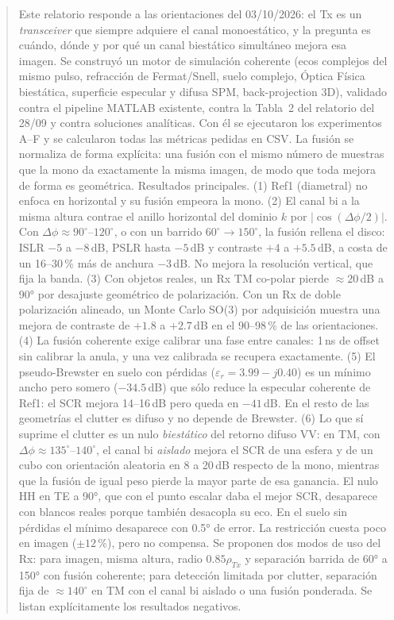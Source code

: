 \begin{abstract}
\noindent
Este relatorio responde a las orientaciones del 03/10/2026: el Tx es un
\emph{transceiver} que siempre adquiere el canal monoestático, y la pregunta es cuándo,
dónde y por qué un canal biestático simultáneo mejora esa imagen. Se construyó un motor
de simulación coherente (ecos complejos del mismo pulso, refracción de Fermat/Snell,
suelo complejo, Óptica Física biestática, superficie especular y difusa SPM,
back-projection 3D), validado contra el pipeline MATLAB existente, contra la Tabla~2 del
relatorio del 28/09 y contra soluciones analíticas. Con él se ejecutaron los
experimentos A--F y se calcularon todas las métricas pedidas en CSV.
La fusión se normaliza de forma explícita: una fusión con el mismo número de muestras
que la mono da exactamente la misma imagen, de modo que toda mejora de forma es
geométrica.
Resultados principales. (1) Ref1 (diametral) no enfoca en horizontal y su fusión empeora
la mono. (2) El canal bi a la misma altura contrae el anillo horizontal del dominio $k$
por $|\cos(\Delta\phi/2)|$. Con $\Delta\phi\approx90^{\circ}$--$120^{\circ}$, o con un barrido
$60^{\circ}\to150^{\circ}$, la fusión rellena el disco: ISLR $-5$ a $-8$\,dB, PSLR hasta $-5$\,dB y
contraste $+4$ a $+5.5$\,dB, a costa de un 16--30\,\% más de anchura $-3$\,dB. No mejora la
resolución vertical, que fija la banda. (3) Con objetos reales, un Rx TM co-polar pierde
$\approx20$\,dB a 90° por desajuste geométrico de polarización. Con un Rx de doble
polarización alineado, un Monte Carlo SO(3) por adquisición muestra una mejora de
contraste de $+1.8$ a $+2.7$\,dB en el 90--98\,\% de las orientaciones. (4) La fusión
coherente exige calibrar una fase entre canales: 1\,ns de offset sin calibrar la anula,
y una vez calibrada se recupera exactamente. (5) El pseudo-Brewster en suelo con pérdidas
($\varepsilon_r=3.99-j0.40$) es un mínimo ancho pero somero ($-34.5$\,dB) que sólo reduce
la especular coherente de Ref1: el SCR mejora 14--16\,dB pero queda en $-41$\,dB. En el
resto de las geometrías el clutter es difuso y no depende de Brewster. (6) Lo que sí suprime
el clutter es un nulo \emph{biestático} del retorno difuso VV: en TM, con
$\Delta\phi\approx135^{\circ}$--$140^{\circ}$, el canal bi \emph{aislado} mejora el SCR de una esfera y
de un cubo con orientación aleatoria en 8 a 20\,dB respecto de la mono, mientras que la
fusión de igual peso pierde la mayor parte de esa ganancia. El nulo HH en TE a 90°, que con
el punto escalar daba el mejor SCR, desaparece con blancos reales porque también desacopla
su eco. En el suelo sin
pérdidas el mínimo desaparece con 0.5° de error. La restricción cuesta poco en imagen
(${\pm}12$\,\%), pero no compensa. Se proponen dos modos de uso del Rx: para imagen, misma altura,
radio $0.85\rho_{Tx}$ y separación barrida de 60° a 150° con fusión coherente; para detección
limitada por clutter, separación fija de $\approx140^{\circ}$ en TM con el canal bi aislado o una
fusión ponderada. Se listan explícitamente los resultados negativos.
\end{abstract}
